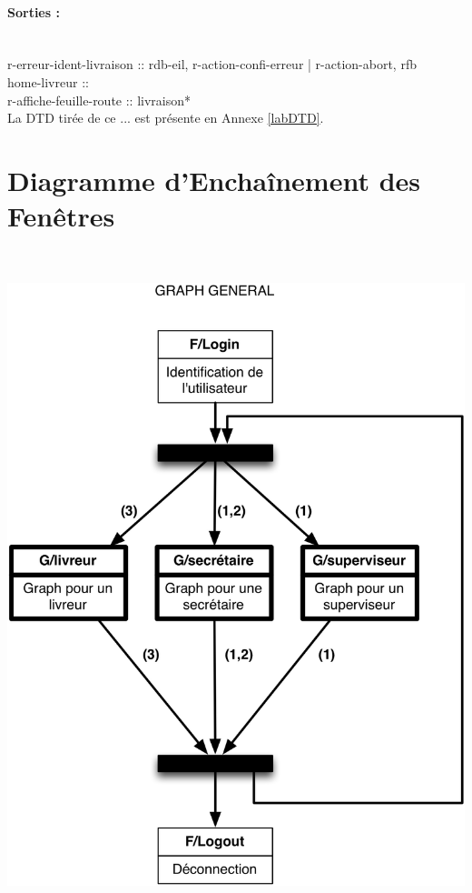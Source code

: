 \documentclass{report}
\begin{document}
\paragraph{Sorties :}
~~\\
r-erreur-ident-livraison :: rdb-eil, r-action-confi-erreur | r-action-abort, rfb\\
home-livreur :: \\
r-affiche-feuille-route :: livraison*\\

La DTD tirée de ce ... est présente en Annexe \ref{labDTD}.

\section{Diagramme d'Enchaînement des Fenêtres}

\paragraph{}
~~\\
\begin{center}
\includegraphics[scale = 0.18]{images/general.jpg}
\end{center}
\end{document}
